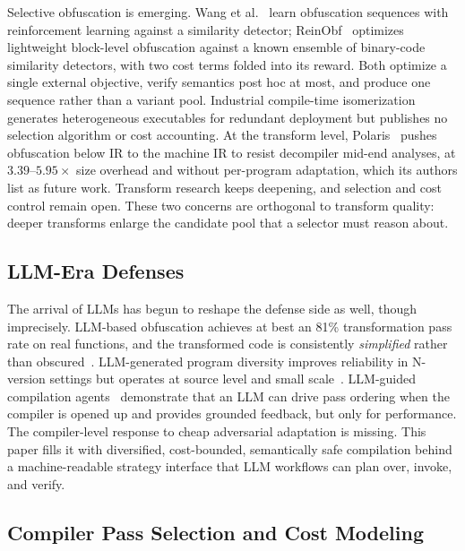 \documentclass[5p,times,authoryear]{elsarticle}
\theoremstyle{plain}
\theoremstyle{definition}
\theoremstyle{remark}
\begin{document}
Selective obfuscation is emerging. Wang et al.~\cite{bib4} learn obfuscation sequences
with reinforcement learning against a similarity detector; ReinObf~\cite{wei2025reinobf}
optimizes lightweight block-level obfuscation against a known ensemble of binary-code
similarity detectors, with two cost terms folded into its reward. Both optimize a
single external objective, verify semantics post hoc at most, and produce one sequence
rather than a variant pool. Industrial compile-time isomerization~\cite{he2024isomerization}
generates heterogeneous executables for redundant deployment but publishes no
selection algorithm or cost accounting. At the transform level,
Polaris~\cite{zhou2026polaris} pushes obfuscation below IR to the machine IR to resist
decompiler mid-end analyses, at $3.39$--$5.95\times$ size overhead and without
per-program adaptation, which its authors list as future work. Transform research
keeps deepening, and selection and cost control remain open. These two concerns are
orthogonal to transform quality: deeper transforms enlarge the candidate pool that a
selector must reason about.

\subsection{LLM-Era Defenses}

The arrival of LLMs has begun to reshape the defense side as well, though
imprecisely. LLM-based obfuscation achieves at best an 81\% transformation
pass rate on real functions, and the transformed code is consistently
\emph{simplified} rather than obscured~\cite{detomasi2025simplicity}.
LLM-generated program diversity improves reliability in N-version settings
but operates at source level and small scale~\cite{ron2026galapagos}.
LLM-guided compilation agents~\cite{li2026autopass} demonstrate that an LLM
can drive pass ordering when the compiler is opened up and provides grounded
feedback, but only for performance. The compiler-level response to cheap
adversarial adaptation is missing. This paper fills it with diversified,
cost-bounded, semantically safe compilation behind a machine-readable
strategy interface that LLM workflows can plan over, invoke, and verify.

\subsection{Compiler Pass Selection and Cost Modeling}
\end{document}
